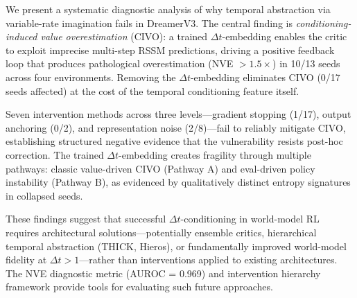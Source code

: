 \documentclass[10pt,letterpaper]{article}
\newcommand{\dt}{\Delta t}
\begin{document}
We present a systematic diagnostic analysis of why temporal abstraction via variable-rate imagination fails in DreamerV3. The central finding is \emph{conditioning-induced value overestimation} (CIVO): a trained $\dt$-embedding enables the critic to exploit imprecise multi-step RSSM predictions, driving a positive feedback loop that produces pathological overestimation (NVE $> 1.5\times$) in 10/13 seeds across four environments. Removing the $\dt$-embedding eliminates CIVO (0/17 seeds affected) at the cost of the temporal conditioning feature itself.

Seven intervention methods across three levels---gradient stopping (1/17), output anchoring (0/2), and representation noise (2/8)---fail to reliably mitigate CIVO, establishing structured negative evidence that the vulnerability resists post-hoc correction. The trained $\dt$-embedding creates fragility through multiple pathways: classic value-driven CIVO (Pathway A) and eval-driven policy instability (Pathway B), as evidenced by qualitatively distinct entropy signatures in collapsed seeds.

These findings suggest that successful $\dt$-conditioning in world-model RL requires architectural solutions---potentially ensemble critics, hierarchical temporal abstraction (THICK, Hieros), or fundamentally improved world-model fidelity at $\dt > 1$---rather than interventions applied to existing architectures. The NVE diagnostic metric (AUROC = 0.969) and intervention hierarchy framework provide tools for evaluating such future approaches.


\end{document}
